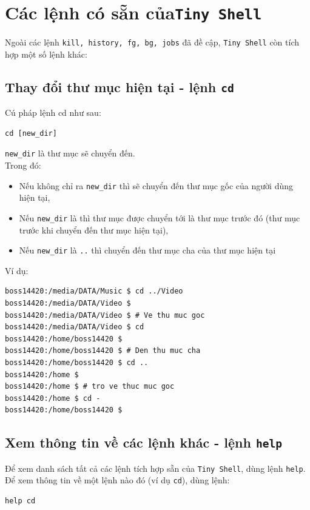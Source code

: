 \documentclass[a4paper,12pt]{report}
\begin{document}
    \section{Các lệnh có sẵn của\texttt{Tiny Shell}} 
        Ngoài các lệnh \texttt{kill, history, fg, bg, jobs} đã đề cập,
        \texttt{Tiny Shell} còn tích hợp một số lệnh khác:
        
        \subsection{Thay đổi thư mục hiện tại - lệnh \texttt{cd}}
            Cú pháp lệnh cd như sau:
            \begin{verbatim}
cd [new_dir]
            \end{verbatim}
            \texttt{new\_dir} là thư mục sẽ chuyển đến.\\
            Trong đó:
            \begin{itemize}
                \item Nếu không chỉ ra \texttt{new\_dir} thì sẽ chuyển đến thư
                    mục gốc của người dùng hiện tại,
                \item Nếu \texttt{new\_dir} là \texttt{\-} thì thư mục được
                    chuyển tới là thư mục trước đó (thư mục trước khi chuyển
                    đến thư mục hiện tại),
                \item Nếu \texttt{new\_dir} là \texttt{..} thì chuyển đến thư
                    mục cha của thư mục hiện tại
            \end{itemize}
            Ví dụ:
            \begin{verbatim}
boss14420:/media/DATA/Music $ cd ../Video
boss14420:/media/DATA/Video $ 
boss14420:/media/DATA/Video $ # Ve thu muc goc
boss14420:/media/DATA/Video $ cd
boss14420:/home/boss14420 $
boss14420:/home/boss14420 $ # Den thu muc cha
boss14420:/home/boss14420 $ cd ..
boss14420:/home $
boss14420:/home $ # tro ve thuc muc goc
boss14420:/home $ cd -
boss14420:/home/boss14420 $
            \end{verbatim}

        \subsection{Xem thông tin về các lệnh khác - lệnh \texttt{help}}
            Để xem danh sách tất cả các lệnh tích hợp sẵn của \texttt{Tiny
            Shell}, dùng lệnh \texttt{help}.\\
            Để xem thông tin về một lệnh nào đó (ví dụ \texttt{cd}), dùng lệnh:
            \begin{verbatim}
help cd
            \end{verbatim}
\end{document}
